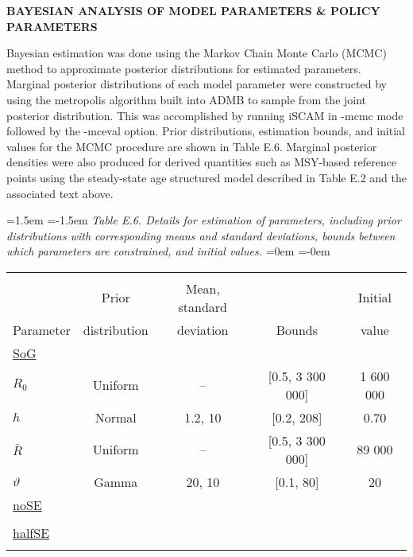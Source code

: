 \documentclass[11pt]{article}   %
\def\AppLet{E}                   %
\def\vsd{\vspace*{1ex}}     %
\begin{document}
\vspace{2ex}
{ \bf BAYESIAN ANALYSIS OF MODEL PARAMETERS \& POLICY PARAMETERS}

Bayesian estimation was done using the Markov Chain Monte Carlo (MCMC) method to approximate posterior distributions for estimated parameters.  Marginal posterior distributions of each model parameter were constructed by using the metropolis algorithm built into ADMB to sample from the joint posterior distribution.  This was accomplished by running iSCAM in -mcmc mode followed by the -mceval option.  Prior distributions, estimation bounds, and initial values for the MCMC procedure are shown in Table \AppLet.6.  Marginal posterior densities were also produced for derived quantities such as MSY-based reference points using the steady-state age structured model described in Table \AppLet.2 and the associated text above.      

\begin{table}[tp]
\leftskip=1.5em
\parindent=-1.5em
{\it Table \AppLet.6. Details for estimation of parameters, including prior distributions with corresponding means and standard deviations, bounds between which parameters are constrained, and initial values.}
\leftskip=0em
\parindent=-0em
\begin{center}
\begin{tabular}{lcccc} 
\hline \\[-1.5ex]
		&  Prior            & Mean, standard   &              & Initial\\ 
 Parameter    &  distribution  &  deviation            & Bounds & value\\ 
\hline %
\multicolumn{5}{l}{\underline{SoG}}\\
$R_0$ & Uniform & -- & [0.5, 3 300 000] & 1 600 000\\
$h$ & Normal & 1.2, 10 & [0.2, 208] & 0.70\\
$\bar{R}$ & Uniform & -- & [0.5, 3 300 000] & 89 000 \\
$\vartheta$ & Gamma & 20, 10 & [0.1, 80] & 20 \\
\multicolumn{5}{l}{\underline{noSE}}\\
\vspace{1ex} \\
\multicolumn{5}{l}{\underline{halfSE}}\\
\vspace{1ex} \\

\hline 
\end{tabular} 
\vsd
\end{center}
\end{table}

\medskip



\newpage
%
%


\end{document}
